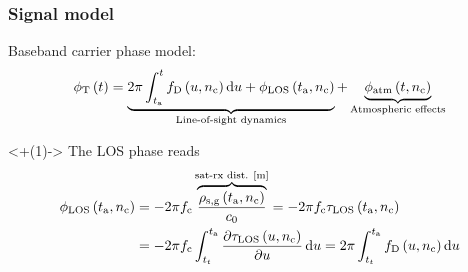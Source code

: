\documentclass[
    hyperref={colorlinks,citecolor=DeepPink4,linkcolor=DarkRed,urlcolor=DarkBlue}
]{beamer_class}
\begin{document}
\begin{frame}[t]
	\frametitle{Signal model}
	Baseband carrier phase model:
    \begin{align}
        \phi_{\mathrm{T}} \left( t \right) = \underbrace{2\pi \int_{t_{\mathrm{a}}}^{t} f_{\mathrm{D}} \left( u, n_{\mathrm{c}} \right)\dd{u} + \phi_{\mathrm{LOS}} \left( t_{\mathrm{a}}, n_{\mathrm{c}} \right)}_{\textnormal{Line-of-sight dynamics}} + \underbrace{\phi_{\mathrm{atm}} \left( t, n_{\mathrm{c}} \right)}_{\textnormal{Atmospheric effects}}
    \end{align}
    \begin{visibleenv}<+(1)->
        The LOS phase reads
        \begin{align}
            \phi_{\mathrm{LOS}} \left( t_{\mathrm{a}}, n_{\mathrm{c}} \right) & = - 2\pi f_{\mathrm{c}} \overbrace{\frac{\rho_{\mathrm{s,g}} \left( t_{\mathrm{a}}, n_{\mathrm{c}} \right)}{c_{0}}}^{\textnormal{sat-rx dist. [m]}} = - 2\pi f_{\mathrm{c}} \tau_{\mathrm{LOS}}\left( t_{\mathrm{a}}, n_{\mathrm{c}} \right) \nonumber \\
         & = - 2 \pi f_{\mathrm{c}} \int_{t_{t}}^{t_{\mathrm{a}}} \frac{\partial \tau_{\mathrm{LOS}}\left( u, n_{\mathrm{c}} \right)}{\partial u}\dd{u} = 2 \pi \int_{t_{t}}^{t_{\mathrm{a}}} f_{\mathrm{D}} \left( u, n_{\mathrm{c}} \right) \dd{u}%
        \end{align}
    \end{visibleenv}
\end{frame}
\end{document}
